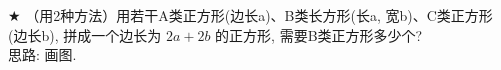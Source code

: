 \item {
    $\bigstar$
    （用2种方法）用若干A类正方形(边长a)、B类长方形(长a, 宽b)、C类正方形(边长b), 拼成一个边长为 $2a + 2b$ 的正方形, 需要B类正方形多少个? 
    \ifshowSolution
        \fangsong{}
        \\
        思路: 画图. 
    \else
        \\ \\ \\ \\ \\ \\ \\ \\
    \fi
}

\begin{comment}
\item {
    观察``杨辉三角'', 计算 $(a+b)^5$ 的结果中, 项 $a^3b^2$的系数, 
    \[
    \begin{matrix}
        & & & & 1 & & & \\
        & & & 1 & & 1 & & \\
        & & 1 & & 2 & & 1 & \\
        & 1 & & 3 & & 3 & & 1 \\
        1 & & 4 & & 6 & & 4 & & 1
    \end{matrix}
    \]
    \begin{align*}
        (a+b)^1 &= a+b \\
        (a+b)^2 &= a^2 + 2ab + b^2 \\
        (a+b)^3 &= a^3 + 3a^2b + 3ab^2 + b^3 \\
        (a+b)^4 &= a^4 + 4a^3b + 6a^2b^2 + 4ab^3 + b^4 \\
    \end{align*}
    \ifshowSolution
        \fangsong\zihao{4}
        \\
    \else
        \\ \\ \\
    \fi
}
\end{comment}

\begin{comment}
\item {
    判断 $49^8 - 14^2\times 7^{12}$ 能否被9整除, 并说明理由. 
    \ifshowSolution
        \fangsong\zihao{4}
        \\
    \else
        \\ \\ \\
    \fi
}
\end{comment}

